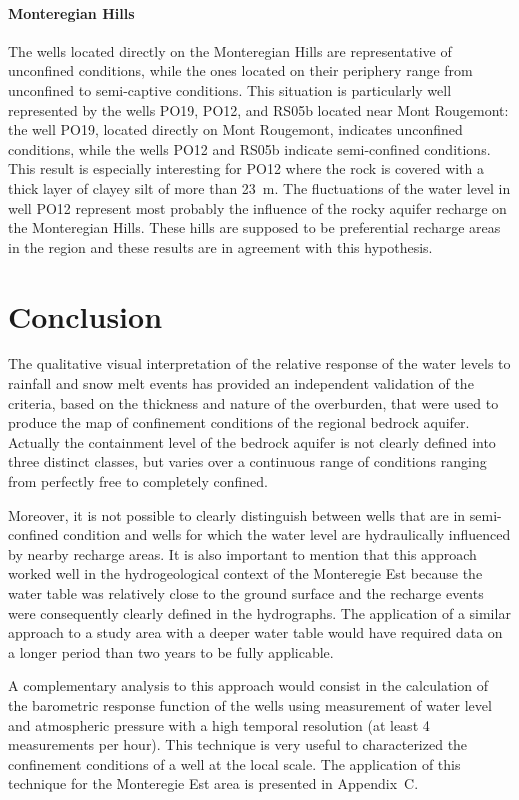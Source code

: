 \documentclass[WHATMANUAL.tex]{subfiles}
\begin{document}
\paragraph{Monteregian Hills} The wells located directly on the Monteregian Hills are representative of unconfined conditions, while the ones located on their periphery range from unconfined to semi-captive conditions. This situation is particularly well represented by the wells PO19, PO12, and RS05b located near Mont Rougemont: the well PO19, located directly on Mont Rougemont, indicates unconfined conditions, while the wells PO12 and RS05b indicate semi-confined conditions. This result is especially interesting for PO12 where the rock is covered with a thick layer of clayey silt of more than 23~m. The fluctuations of the water level in well PO12 represent most probably the influence of the rocky aquifer recharge on the Monteregian Hills. These hills are supposed to be preferential recharge areas in the region and these results are in agreement with this hypothesis.

\newpage

\section{Conclusion}

The qualitative visual interpretation of the relative response of the water levels to rainfall and snow melt events has provided an independent validation of the criteria, based on the thickness and nature of the overburden, that were used to produce the map of confinement conditions of the regional bedrock aquifer. Actually the containment level of the bedrock aquifer is not clearly defined into three distinct classes, but varies over a continuous range of conditions ranging from perfectly free to completely confined.

Moreover, it is not possible to clearly distinguish between wells that are in semi-confined condition and wells for which the water level are hydraulically influenced by nearby recharge areas. It is also important to mention that this approach worked well in the hydrogeological context of the Monteregie Est because the water table was relatively close to the ground surface and the recharge events were consequently clearly defined in the hydrographs. The application of a similar approach to a study area with a deeper water table would have required data on a longer period than two years to be fully applicable.

A complementary analysis to this approach would consist in the calculation of the barometric response function of the wells using measurement of water level and atmospheric pressure with a high temporal resolution (at least 4 measurements per hour). This technique is very useful to characterized the confinement conditions of a well at the local scale. The application of this technique for the Monteregie Est area is presented in Appendix~C.
\end{document}
